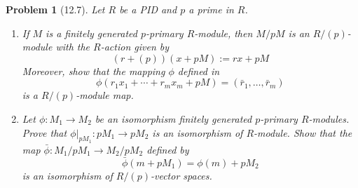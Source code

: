 \documentclass[10pt]{article}
\theoremstyle{plain}
\newtheorem{problem}{Problem}
\theoremstyle{remark}
\begin{document}
\begin{problem}[12.7]
  Let $R$ be a PID and $p$ a prime in $R$.
  \begin{enumerate}
  \item If $M$ is a finitely generated $p$-primary $R$-module, then
    $M/pM$ is an $R/(p)$-module with the $R$-action given by
    \[ (r+(p))(x+pM):= rx+pM \]
    Moreover, show that the mapping $\phi$ defined in
    \[ \phi(r_1x_1+\cdots + r_mx_m +pM) = (\bar{r}_1,\ldots,\bar{r}_m) \]
    is a $R/(p)$-module map.
  \item Let $\phi:M_1\rightarrow M_2$ be an isomorphism finitely generated $p$-primary
    $R$-modules. Prove that $\phi|_{pM_1}:pM_1\rightarrow pM_2$ is an isomorphism
    of $R$-module. Show that the map $\bar{\phi}:M_1/pM_1\rightarrow M_2/pM_2$ defined by
    \[ \bar{\phi}(m+pM_1)=\phi(m)+pM_2\]
    is an isomorphism of $R/(p)$-vector spaces.
  \end{enumerate}
\end{problem}
\end{document}
